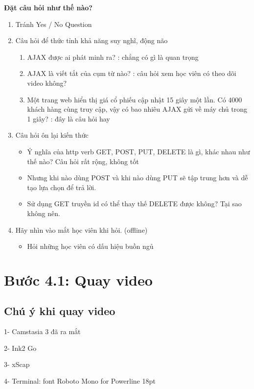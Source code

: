 \textbf{Đặt câu hỏi như thế nào?}

\begin{enumerate}
  \item Tránh Yes / No Question
  \item Câu hỏi để thức tỉnh khả năng suy nghĩ, động não
  \begin{enumerate}
    \item AJAX được ai phát minh ra? : chẳng có gì là quan trọng
    \item AJAX là viết tắt của cụm từ nào? : câu hỏi xem học viên có theo dõi video không?
    \item Một trang web hiển thị giá cổ phiếu cập nhật 15 giây một lần. Có 4000 khách hàng cùng truy cập, vậy có bao nhiêu AJAX gửi về máy chủ trong 1 giây? : đây là câu hỏi hay
  \end{enumerate}
  \item Câu hỏi ôn lại kiến thức
  \begin{itemize}
    \item Ý nghĩa của http verb GET, POST, PUT, DELETE là gì, khác nhau như thế nào? Câu hỏi rất rộng, không tốt
    \item Nhưng khi nào dùng POST và khi nào dùng PUT sẽ tập trung hơn và dễ tạo lựa chọn để trả lời.
    \item Sử dụng GET truyền id có thể thay thế DELETE được không? Tại sao không nên.
  \end{itemize}
  \item Hãy nhìn vào mắt học viên khi hỏi. (offline)
  \begin{itemize}
    \item Hỏi những học viên có dấu hiệu buồn ngủ
  \end{itemize}
\end{enumerate}

\section{Bước 4.1: Quay video}

\subsection{Chú ý khi quay video}

1- Camstasia 3 đã ra mắt

2- Ink2 Go

3- xScap

4- Terminal: font Roboto Mono for Powerline 18pt


